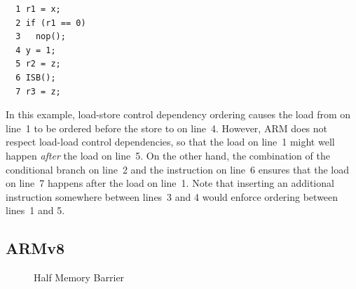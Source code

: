 \vspace{5pt}
\begin{minipage}[t]{\columnwidth}
\small
\begin{verbatim}
  1 r1 = x;
  2 if (r1 == 0)
  3   nop();
  4 y = 1;
  5 r2 = z;
  6 ISB();
  7 r3 = z;
\end{verbatim}
\end{minipage}
\vspace{5pt}

In this example, load-store control dependency ordering causes
the load from  on line~1 to be ordered before the store to
 on line~4.
However, ARM does not respect load-load control dependencies, so that
the load on line~1 might well happen \emph{after} the
load on line~5.
On the other hand, the combination of the conditional branch on line~2
and the  instruction on line~6 ensures that
the load on line~7 happens after the load on line~1.
Note that inserting an additional  instruction somewhere between
lines~3 and 4 would enforce ordering between lines~1 and 5.

\subsection{ARMv8}

\begin{figure}[tb]
\centering
{}
\caption{Half Memory Barrier}
\end{figure}

